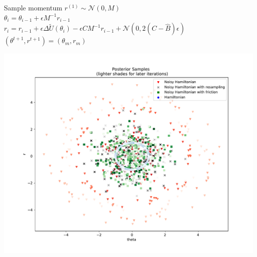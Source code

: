 \begin{algorithm}[H]
	 {
		Sample momentum $r^{(1)}\sim\mathcal{N}(0, M)$\\
		 {
			$\theta_i=\theta_{i-1}+\epsilon M^{-1}r_{i-1}$\\
			$r_i = r_{i-1} + \epsilon \Delta\tilde{U}(\theta_i)-\epsilon C M^{-1}r_{i-1}+\mathcal{N}(0, 2(C-\hat{B})\epsilon)$\\
		}
		$(\theta^{t+1}, r^{t+1})=(\theta_m, r_m)$\\
	}
\end{algorithm}

\includegraphics[]{posterior_samples.pdf}